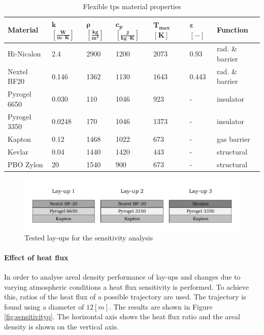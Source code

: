 \begin{table}[ht]
	\caption {Flexible \acrlong{tps} material properties \cite{Corso2009,Corso2011,DuPont2011,Smith2011,Nye,Zinkle1998}}
	\centering
	\begin{tabular}{|l|l|l|l|l|l|l|}
		\hline
	        \textbf{Material}         & \textbf{ $\mathbf{k}$ $\mathbf{\left[\frac{W}{m\cdot K}\right]} $} & \textbf{ $\mathbf{ \rho }$ $\mathbf{ \left[ \frac{kg}{m^3} \right] }$} & \textbf{  $\mathbf{ c_{p} }$ $\mathbf{ \left[ \frac{J}{kg \cdot K} \right] }$ }& \textbf{ $\mathbf{ T_{max} }$ $\mathbf{ [ K ] }$} &\textbf{ $\mathbf{ \varepsilon }$ $\mathbf{ [ - ] }$} & \textbf{Function} \\[1.6ex]   \hline \hline
		Hi-Nicalon			& 2.4			& 2900	& 1200	& 2073	& 0.93	& rad. \& barrier	\\ \hline
		Nextel BF20			& 0.146			& 1362	& 1130	& 1643	& 0.443	& rad. \& barrier	\\ \hline
		Pyrogel 6650		& 0.030			& 110	& 1046	& 923	& -		& insulator			\\ \hline
		Pyrogel 3350		& 0.0248		& 170	& 1046	& 1373	& -		& insulator			\\ \hline
		Kapton				& 0.12			& 1468	& 1022	& 673	& -		& gas barrier		\\ \hline
		Kevlar				& 0.04			& 1440	& 1420	& 443	& -		& structural		\\ \hline
		PBO Zylon			& 20			& 1540	& 900	& 673	& -		& structural		\\ \hline

	\end{tabular}
	\label{tab:tpsmatprop}
\vspace{-4mm}
\end{table}

\begin{figure}[h]
	\centering
	\includegraphics[width=\textwidth]{./Figure/Thermal/layersensthermal.pdf}
	\caption{Tested lay-ups for the sensitivity analysis}
	\label{fig:layersensthermal}
\end{figure}

\paragraph{Effect of heat flux}
In order to analyse areal density performance of lay-ups and changes due to varying atmospheric conditions a heat flux sensitivity is performed. To achieve this, ratios of the heat flux of a possible trajectory are used. The trajectory is found using a diameter of $12 \left[ m \right]$. The results are shown in Figure \ref{fig:sensitivityq}. The horizontal axis shows the heat flux ratio and the areal density is shown on the vertical axis. 

